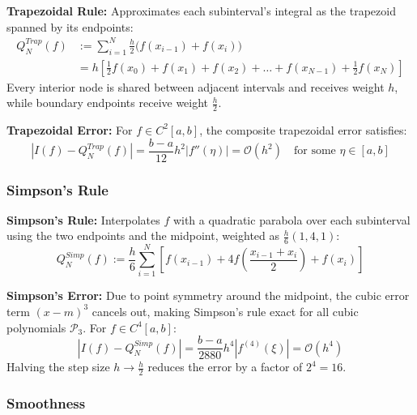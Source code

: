 \begin{definition}
    \textbf{Trapezoidal Rule:} Approximates each subinterval's integral as the trapezoid spanned by its endpoints:
    \begin{align*}
        Q_N^{Trap}(f) &:= \sum_{i=1}^N \frac{h}{2} \Big(f(x_{i-1}) + f(x_i)\Big) \\
        &= h \left[ \frac{1}{2}f(x_0) + f(x_1) + f(x_2) + \dots + f(x_{N-1}) + \frac{1}{2}f(x_N) \right]
    \end{align*}
    Every interior node is shared between adjacent intervals and receives weight $h$, while boundary endpoints receive weight $\frac{h}{2}$.
\end{definition}

\begin{theorem}
    \textbf{Trapezoidal Error:} For $f \in C^2[a,b]$, the composite trapezoidal error satisfies:
    $$|I(f) - Q_N^{Trap}(f)| = \frac{b-a}{12} h^2 |f''(\eta)| = \mathcal{O}(h^2) \quad \text{for some } \eta \in [a,b]$$
\end{theorem}

\subsubsection{Simpson's Rule}

\begin{definition}
    \textbf{Simpson's Rule:} Interpolates $f$ with a quadratic parabola over each subinterval using the two endpoints and the midpoint, weighted as $\frac{h}{6}(1, 4, 1)$:
    $$Q_N^{Simp}(f) := \frac{h}{6} \sum_{i=1}^N \left[ f(x_{i-1}) + 4 f\left(\frac{x_{i-1}+x_i}{2}\right) + f(x_i) \right]$$
\end{definition}

\begin{theorem}
    \textbf{Simpson's Error:} Due to point symmetry around the midpoint, the cubic error term $(x-m)^3$ cancels out, making Simpson's rule exact for all cubic polynomials $\mathcal{P}_3$. For $f \in C^4[a,b]$:
    $$|I(f) - Q_N^{Simp}(f)| = \frac{b-a}{2880} h^4 |f^{(4)}(\xi)| = \mathcal{O}(h^4)$$
    Halving the step size $h \to \frac{h}{2}$ reduces the error by a factor of $2^4 = 16$.
\end{theorem}

\subsubsection{Smoothness}

